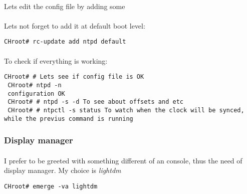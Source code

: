 \documentclass[11pt,a4paper]{article}
\begin{document}
                    \paragraph{} Lets edit the config file by adding some 
                    
                    
                    
                    \paragraph{} Lets not forget to add it at default boot level:
                    
                    \begin{lstlisting}[style=BashInputCHRoot]
 CHroot# rc-update add ntpd default
                    \end{lstlisting}
                    
                    \paragraph{} To check if everything is working:
                    
                    \begin{lstlisting}[style=BashInputCHRoot]
 CHroot# # Lets see if config file is OK
 CHroot# ntpd -n
 configuration OK
 CHroot# # ntpd -s -d To see about offsets and etc
 CHroot# # ntpctl -s status To watch when the clock will be synced, while the previus command is running
                    \end{lstlisting}

                \newpage
                \subsubsection{Display manager}

                    \paragraph{} I prefer to be greeted with something different of an console, thus the need of display manager. My choice is \textit{lightdm}

                    \begin{lstlisting}[style=BashInputCHRoot]
 CHroot# emerge -va lightdm
                    \end{lstlisting}
\end{document}
